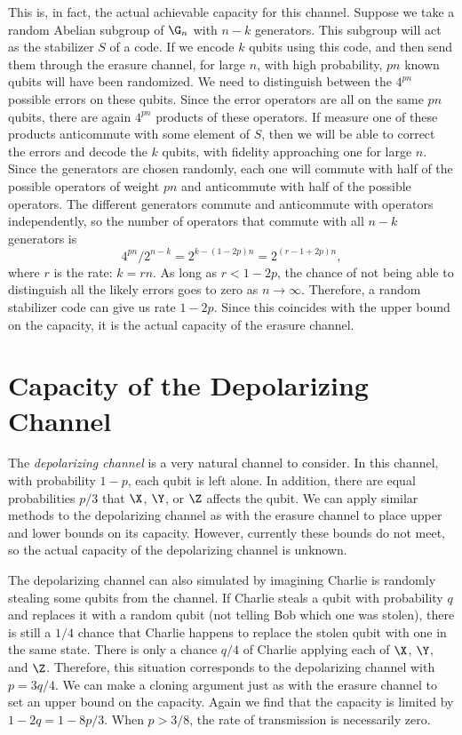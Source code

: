 This is, in fact, the actual achievable capacity for this channel.  Suppose we
take a random Abelian subgroup of $\G_n$ with $n-k$ generators.  This
subgroup will act as the stabilizer $S$ of a code.  If we encode $k$ qubits
using this code, and then send them through the erasure channel, for large
$n$, with high probability, $pn$ known qubits will have been randomized.
We need to distinguish between the $4^{pn}$ possible errors on these
qubits.  Since the error operators are all on the same $pn$ qubits, there are
again $4^{pn}$ products of these operators.  If measure one of these products
anticommute with some element of $S$, then we will be able to correct the
errors and decode the $k$ qubits, with fidelity approaching one for large $n$.
Since the generators are chosen randomly, each one will commute with half of
the possible operators of weight $pn$ and anticommute with half of the possible
operators.  The different generators commute and anticommute with operators
independently, so the number of operators that commute with all $n-k$
generators is
\begin{equation}
	4^{pn} / 2^{n-k} = 2^{k - (1-2p)n} = 2^{(r - 1 + 2p) n},
\end{equation}
where $r$ is the rate: $k = rn$.  As long as $r < 1 - 2p$, the chance of not
being able to distinguish all the likely errors goes to zero as $n \rightarrow
\infty$.  Therefore, a random stabilizer code can give us rate $1-2p$.  Since
this coincides with the upper bound on the capacity, it is the actual
capacity of the erasure channel.

\section{Capacity of the Depolarizing Channel}
\label{depolarizing}

The {\em depolarizing channel} is a very natural channel to consider.  In this
channel, with probability $1-p$, each qubit is left alone.  In addition, there
are equal probabilities $p/3$ that $\X$, $\Y$, or $\Z$ affects the qubit.  We
can apply similar methods to the depolarizing channel as with the erasure
channel to place upper and lower bounds on its capacity.  However,
currently these bounds do not meet, so the actual capacity of the
depolarizing channel is unknown.

The depolarizing channel can also simulated by imagining Charlie is
randomly stealing some qubits from the channel.  If Charlie steals a qubit
with probability $q$ and replaces it with a random qubit (not telling Bob
which one was stolen), there is still a $1/4$ chance that Charlie happens to
replace the stolen qubit with one in the same state.  There is only a chance
$q/4$ of Charlie applying each of $\X$, $\Y$, and $\Z$.  Therefore, this
situation corresponds to the depolarizing channel with $p = 3q/4$.  We can
make a cloning argument just as with the erasure channel to set an upper
bound on the capacity.  Again we find that the capacity is limited by $1-2q
= 1- 8p/3$.  When $p > 3/8$, the rate of transmission is necessarily zero.

